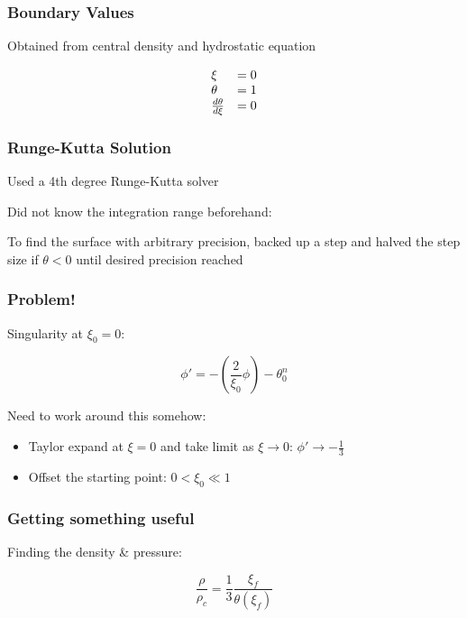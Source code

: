 \documentclass[handout]{beamer}
\begin{document}
        \begin{frame}
            \frametitle{Boundary Values}

            Obtained from central density and hydrostatic equation

            \[
                \begin{array}{l l}
                    \xi &= 0 \\
                    \theta &= 1 \\
                    \frac{d\theta}{d\xi} &= 0
                \end{array}
            \]

        \end{frame}

        \begin{frame}
            \frametitle{Runge-Kutta Solution}

            Used a 4th degree Runge-Kutta solver

            Did not know the integration range beforehand:

            To find the surface with arbitrary precision, backed up a step and
            halved the step size if \(\theta<0\) until desired precision reached

        \end{frame}

        \begin{frame}
           \frametitle{Problem!}

            Singularity at \(\xi_0=0\):

            \[ \phi'=-\left(\frac{2}{\xi_0}\phi\right)-\theta_0^n\]

            Need to work around this somehow:
            \pause
            \begin{itemize}
                \item Taylor expand at \(\xi=0\) and take limit as \(\xi\rightarrow 0\): \(\phi'\rightarrow -\frac{1}{3}\)
                \pause
                \item Offset the starting point: \(0< \xi_0 \ll 1\)
            \end{itemize}

        \end{frame}

        \begin{frame}
            \frametitle{Getting something useful}

           Finding the density \& pressure:

           \[\frac{\rho}{\rho_c} = \frac{1}{3}\frac{\xi_f}{\theta(\xi_f)}\]

        \end{frame}
\end{document}
